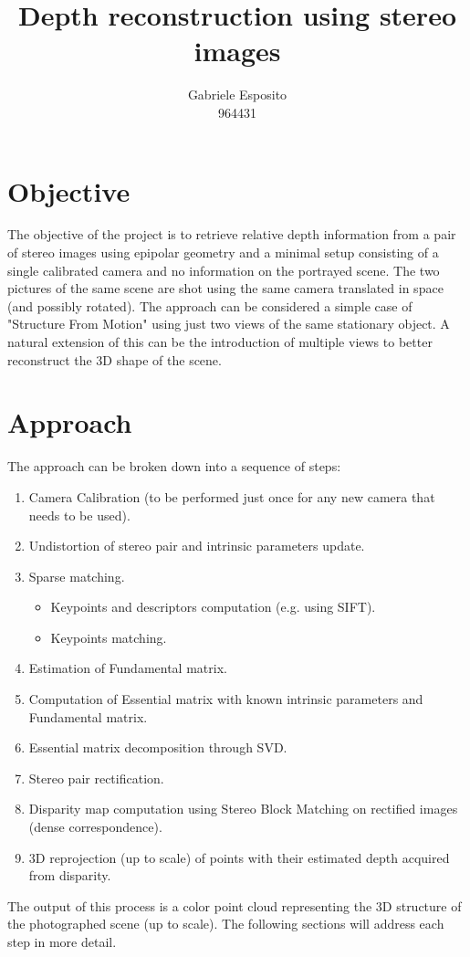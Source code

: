 \documentclass[12pt]{amsart}
\title{Depth reconstruction using stereo images}
\author{Gabriele Esposito\\964431}
\begin{document}
\setlength{\parskip}{0pt} %
\setlength{\parindent}{0pt}
\maketitle
\section*{Objective}
The objective of the project is to retrieve relative depth information from a pair of stereo images using epipolar geometry and a minimal setup consisting of a 
single calibrated camera and no information on the portrayed scene. 
The two pictures of the same scene are shot using the same camera translated in space (and possibly rotated). The approach can be considered a
simple case of "Structure From Motion" using just two views of the same stationary object. A natural extension of this can be the introduction of multiple views to better reconstruct 
the 3D shape of the scene.
\section*{Approach}
The approach can be broken down into a sequence of steps:
\begin{enumerate}[label={\arabic*.}]
    \item Camera Calibration (to be performed just once for any new camera that needs to be used).
    \item Undistortion of stereo pair and intrinsic parameters update.
    \item Sparse matching.
        \begin{itemize} 
            \item Keypoints and descriptors computation (e.g. using SIFT).
            \item Keypoints matching.
        \end{itemize}
    \item Estimation of Fundamental matrix.
    \item Computation of Essential matrix with known intrinsic parameters and Fundamental matrix.
    \item Essential matrix decomposition through SVD.
    \item Stereo pair rectification.
    \item Disparity map computation using Stereo Block Matching on rectified images (dense correspondence).
    \item 3D reprojection (up to scale) of points with their estimated depth acquired from disparity.
\end{enumerate}
The output of this process is a color point cloud representing the 3D structure of the photographed scene (up to scale).
The following sections will address each step in more detail.
\end{document}
